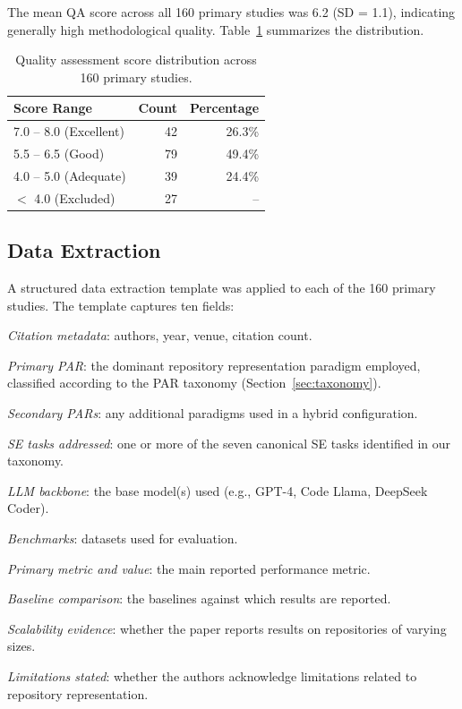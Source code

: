 The mean QA score across all 160 primary studies was 6.2 (SD = 1.1), indicating generally high
methodological quality. Table~\ref{tab:qa-distribution} summarizes the distribution.

\begin{table}[h]
\caption{Quality assessment score distribution across 160 primary studies.}
\label{tab:qa-distribution}
\small
\begin{tabular}{lrr}
\toprule
\textbf{Score Range} & \textbf{Count} & \textbf{Percentage} \\
\midrule
7.0 -- 8.0 (Excellent) & 42 & 26.3\% \\
5.5 -- 6.5 (Good) & 79 & 49.4\% \\
4.0 -- 5.0 (Adequate) & 39 & 24.4\% \\
$<$ 4.0 (Excluded) & 27 & -- \\
\bottomrule
\end{tabular}
\end{table}

\subsection{Data Extraction}
\label{subsec:extraction}

A structured data extraction template was applied to each of the 160 primary studies. The
template captures ten fields:

\begin{description}[leftmargin=2.5em, labelwidth=2.5em]
  \item[\textbf{F1.}] \textit{Citation metadata}: authors, year, venue, citation count.
  \item[\textbf{F2.}] \textit{Primary PAR}: the dominant repository representation paradigm
    employed, classified according to the PAR taxonomy (Section~\ref{sec:taxonomy}).
  \item[\textbf{F3.}] \textit{Secondary PARs}: any additional paradigms used in a hybrid
    configuration.
  \item[\textbf{F4.}] \textit{SE tasks addressed}: one or more of the seven canonical SE
    tasks identified in our taxonomy.
  \item[\textbf{F5.}] \textit{LLM backbone}: the base model(s) used (e.g., GPT-4, Code Llama,
    DeepSeek Coder).
  \item[\textbf{F6.}] \textit{Benchmarks}: datasets used for evaluation.
  \item[\textbf{F7.}] \textit{Primary metric and value}: the main reported performance metric.
  \item[\textbf{F8.}] \textit{Baseline comparison}: the baselines against which results are
    reported.
  \item[\textbf{F9.}] \textit{Scalability evidence}: whether the paper reports results on
    repositories of varying sizes.
  \item[\textbf{F10.}] \textit{Limitations stated}: whether the authors acknowledge limitations
    related to repository representation.
\end{description}

